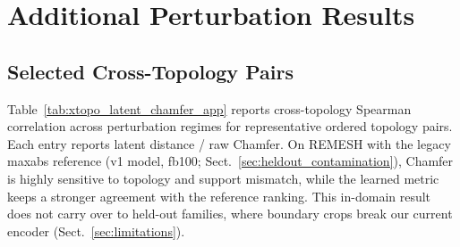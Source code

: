 \documentclass[10pt,twocolumn,letterpaper]{article}
\begin{document}
\begin{table}[!htbp]
\centering
\scriptsize
\caption{
Latent distance clean same-topology and cross-topology Spearman correlation with
95\% subject-level bootstrap confidence intervals. Rows indicate source topology
and columns indicate target topology.
}
\label{tab:xtopo_latent_ci_app}
\setlength{\tabcolsep}{2.0pt}
\renewcommand{\arraystretch}{1.08}
\end{table}

\section{Additional Perturbation Results}

\label{app:perturbations}


\subsection{Selected Cross-Topology Pairs}
\label{app:selected_topology_pairs}

Table~\ref{tab:xtopo_latent_chamfer_app} reports cross-topology Spearman
correlation across perturbation regimes for representative ordered topology
pairs. Each entry reports latent distance / raw Chamfer. On REMESH with the legacy
maxabs reference (v1 model, fb100; Sect.~\ref{sec:heldout_contamination}), Chamfer
is highly sensitive to topology and support mismatch, while the learned metric
keeps a stronger agreement with the reference ranking. This in-domain result does
not carry over to held-out families, where boundary crops break our current
encoder (Sect.~\ref{sec:limitations}).
\end{document}
